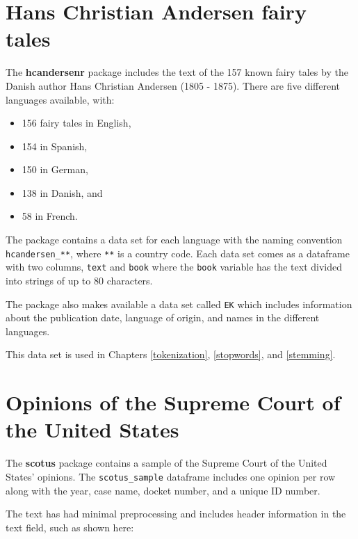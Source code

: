 \documentclass[
]{krantz}
\begin{document}
\hypertarget{hcandersen}{%
\section{Hans Christian Andersen fairy tales}\label{hcandersen}}

The \textbf{hcandersenr} \citep{R-hcandersenr} package includes the text of the 157 known fairy tales by the Danish author Hans Christian Andersen (1805 - 1875).
There are five different languages available, with:

\begin{itemize}
\item
  156 fairy tales in English,
\item
  154 in Spanish,
\item
  150 in German,
\item
  138 in Danish, and
\item
  58 in French.
\end{itemize}

The package contains a data set for each language with the naming convention \texttt{hcandersen\_**},
where \texttt{**} is a country code.
Each data set comes as a dataframe with two columns, \texttt{text} and \texttt{book} where the \texttt{book} variable has the text divided into strings of up to 80 characters.

The package also makes available a data set called \texttt{EK} which includes information about the publication date, language of origin, and names in the different languages.

This data set is used in Chapters \ref{tokenization}, \ref{stopwords}, and \ref{stemming}.

\hypertarget{scotus-opinions}{%
\section{Opinions of the Supreme Court of the United States}\label{scotus-opinions}}

The \textbf{scotus} \citep{R-scotus} package contains a sample of the Supreme Court of the United States' opinions.
The \texttt{scotus\_sample} dataframe includes one opinion per row along with the year, case name, docket number, and a unique ID number.

The text has had minimal preprocessing and includes header information in the text field, such as shown here:
\end{document}
